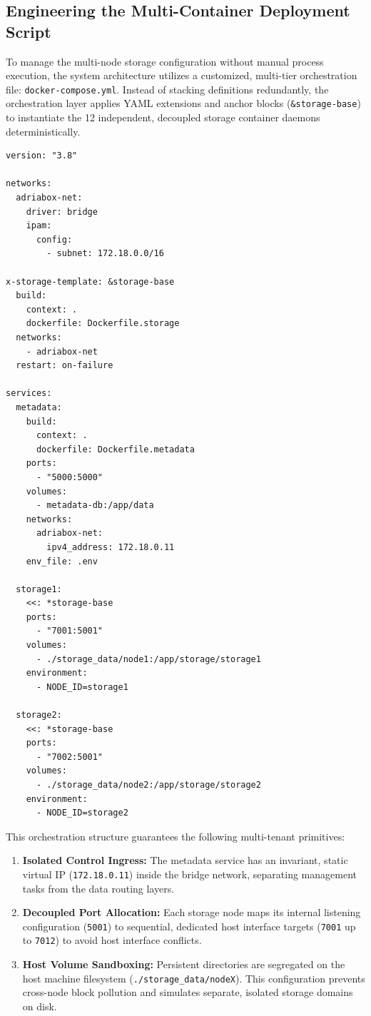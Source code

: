 \subsection{Engineering the Multi-Container Deployment Script}
To manage the multi-node storage configuration without manual process execution, the system architecture utilizes a customized, multi-tier orchestration file: \texttt{docker-compose.yml}. Instead of stacking definitions redundantly, the orchestration layer applies YAML extensions and anchor blocks (\texttt{\&storage-base}) to instantiate the 12 independent, decoupled storage container daemons deterministically.

\begin{lstlisting}[basicstyle=\small\ttfamily, frame=single, keepspaces=true, columns=flexible]
version: "3.8"

networks:
  adriabox-net:
    driver: bridge
    ipam:
      config:
        - subnet: 172.18.0.0/16

x-storage-template: &storage-base
  build:
    context: .
    dockerfile: Dockerfile.storage
  networks:
    - adriabox-net
  restart: on-failure

services:
  metadata:
    build:
      context: .
      dockerfile: Dockerfile.metadata
    ports:
      - "5000:5000"
    volumes:
      - metadata-db:/app/data
    networks:
      adriabox-net:
        ipv4_address: 172.18.0.11
    env_file: .env

  storage1:
    <<: *storage-base
    ports:
      - "7001:5001"
    volumes:
      - ./storage_data/node1:/app/storage/storage1
    environment:
      - NODE_ID=storage1

  storage2:
    <<: *storage-base
    ports:
      - "7002:5001"
    volumes:
      - ./storage_data/node2:/app/storage/storage2
    environment:
      - NODE_ID=storage2
\end{lstlisting}

This orchestration structure guarantees the following multi-tenant primitives:
\begin{enumerate}
    \item \textbf{Isolated Control Ingress:} The metadata service has an invariant, static virtual IP (\texttt{172.18.0.11}) inside the bridge network, separating management tasks from the data routing layers.
    \item \textbf{Decoupled Port Allocation:} Each storage node maps its internal listening configuration (\texttt{5001}) to sequential, dedicated host interface targets (\texttt{7001} up to \texttt{7012}) to avoid host interface conflicts.
    \item \textbf{Host Volume Sandboxing:} Persistent directories are segregated on the host machine filesystem (\texttt{./storage\_data/nodeX}). This configuration prevents cross-node block pollution and simulates separate, isolated storage domains on disk.
\end{enumerate}

